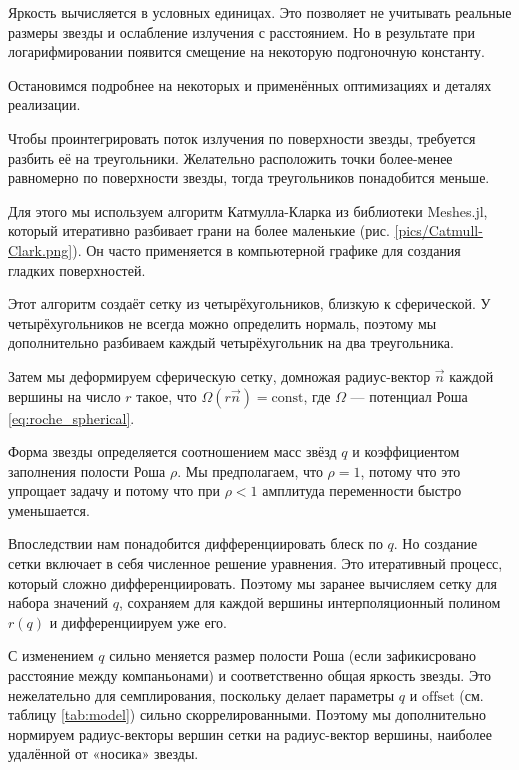 Яркость вычисляется в условных единицах. Это позволяет не учитывать реальные размеры звезды и ослабление излучения с расстоянием. Но в результате при логарифмировании появится смещение на некоторую подгоночную константу.

Остановимся подробнее на некоторых и применённых оптимизациях и деталях реализации.


Чтобы проинтегрировать поток излучения по поверхности звезды, требуется разбить её на треугольники. Желательно расположить точки более-менее равномерно по поверхности звезды, тогда треугольников понадобится меньше.

Для этого мы используем алгоритм Катмулла-Кларка из библиотеки Meshes.jl, который итеративно разбивает грани на более маленькие (рис. \ref{pics/Catmull-Clark.png}). Он часто применяется в компьютерной графике для создания гладких поверхностей.


Этот алгоритм создаёт сетку из четырёхугольников, близкую к сферической. У четырёхугольников не всегда можно определить нормаль, поэтому мы дополнительно разбиваем каждый четырёхугольник на два треугольника.

Затем мы деформируем сферическую сетку, домножая радиус-вектор $\vec n$ каждой вершины на число $r$ такое, что $\Omega(r \vec n) = \text{const}$, где $\Omega$ --- потенциал Роша \eqref{eq:roche_spherical}.

Форма звезды определяется соотношением масс звёзд $q$ и коэффициентом заполнения полости Роша $\rho.$ Мы предполагаем, что $\rho = 1$, потому что это упрощает задачу и потому что при $\rho < 1$ амплитуда переменности быстро уменьшается.

Впоследствии нам понадобится дифференциировать блеск по $q$. Но создание сетки включает в себя численное решение уравнения. Это итеративный процесс, который сложно дифференциировать. Поэтому мы заранее вычисляем сетку для набора значений $q$, сохраняем для каждой вершины интерполяционный полином $r(q)$ и дифференциируем уже его.

С изменением $q$ сильно меняется размер полости Роша (если зафикисровано расстояние между компаньонами) и соответственно общая яркость звезды. Это нежелательно для семплирования, поскольку делает параметры $q$ и $\text{offset}$ (см. таблицу \ref{tab:model}) сильно скоррелированными. Поэтому мы дополнительно нормируем радиус-векторы вершин сетки на радиус-вектор вершины, наиболее удалённой от «носика» звезды.

